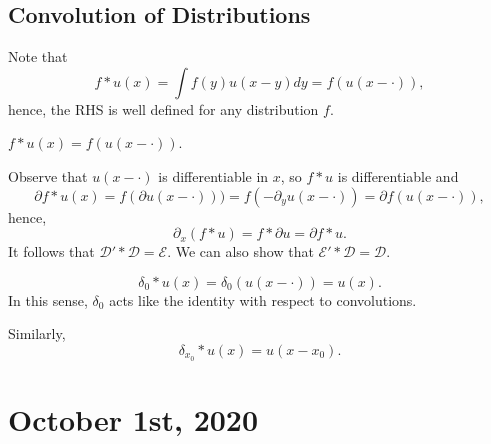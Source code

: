 \documentclass[11pt]{scrartcl}
\begin{document}
\subsection{Convolution of Distributions}
Note that 
$$f*u(x) = \int f(y)u(x-y) dy = f(u(x- \cdot)),$$
hence, the RHS is well defined for any distribution $f$. 
\begin{definition} $f * u(x) = f(u(x - \cdot)).$
\end{definition}
Observe that $u(x-\cdot )$ is differentiable in $x$, so $f*u$ is differentiable and $$\partial f*u(x) = f(\partial u(x-\cdot))) = f(-\partial_y u(x-\cdot)) = \partial f(u(x- \cdot)),$$
hence,
  $$\partial_x(f * u) = f * \partial u = \partial f * u.$$
It follows that $\mathcal D' * \mathcal D = \mathcal E$.  We can also show that $\mathcal E' * \mathcal D = \mathcal D$.
\begin{example} $$\delta_0 * u(x) = \delta_0(u(x- \cdot)) = u(x).$$  In this sense, $\delta_0$ acts like the identity with respect to convolutions.

Similarly,
$$\delta_{x_0}*u(x) = u(x-x_0).$$
\end{example}
\pagebreak
\section{October 1st, 2020}
\end{document}
